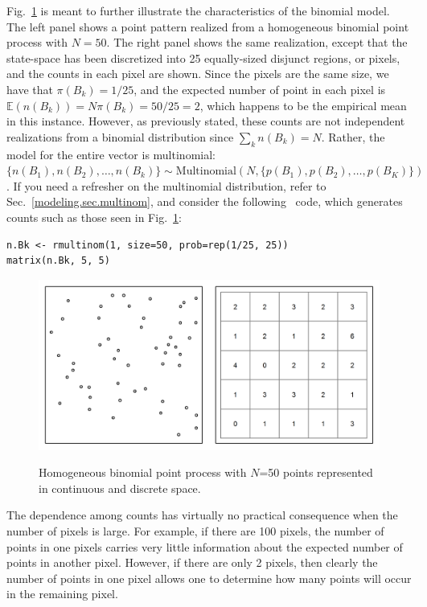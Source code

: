 Fig.~\ref{state-space.fig.homo} is meant to further illustrate the characteristics
of the binomial model. The left panel shows a point pattern
realized from a
homogeneous binomial point process with $N=50$. The right panel shows
the same realization, except that the state-space has been discretized
into 25 equally-sized disjunct regions, or pixels, and the counts in each pixel
are shown. Since the pixels are the same
size, we have that $\pi(B_k) = 1/25$, and the expected number of point in each
pixel is $\mathbb{E}(n(B_k)) = N\pi(B_k) = 50/25 = 2$, which
happens to be the empirical mean in this instance. However, as
previously stated, these counts are not
independent realizations from a binomial distribution since $\sum_k
n(B_k) = N$. Rather, the model for the entire vector is multinomial:
$\{n(B_1), n(B_2), \dots, n(B_k)\} \sim \mbox{Multinomial}(N, \{p(B_1), p(B_2), \dots,
p(B_K) \})$ \citep{illian_etal:2008}. If you need a refresher on the
multinomial distribution, refer to Sec.~\ref{modeling.sec.multinom}, and
consider the following \R~code, which generates counts such as those
seen in Fig.~\ref{state-space.fig.homo}:
\begin{verbatim}
n.Bk <- rmultinom(1, size=50, prob=rep(1/25, 25))
matrix(n.Bk, 5, 5)
\end{verbatim}

\begin{figure}%
\centering
\includegraphics[width=\textwidth]{Ch11-Statespace/figs/homoPlots}
\label{state-space.fig.homo}
\caption{Homogeneous binomial point process with $N$=50 points
  represented in continuous and discrete space.}
\end{figure}

The dependence among counts has virtually
no practical consequence when the number of pixels is large. For
example, if there are 100 pixels, the number of points in one pixels
carries very little information about the expected number of points in another
pixel. However, if there are only 2 pixels, then clearly the number of
points in one pixel allows one to determine how many points will occur in the
remaining pixel.

